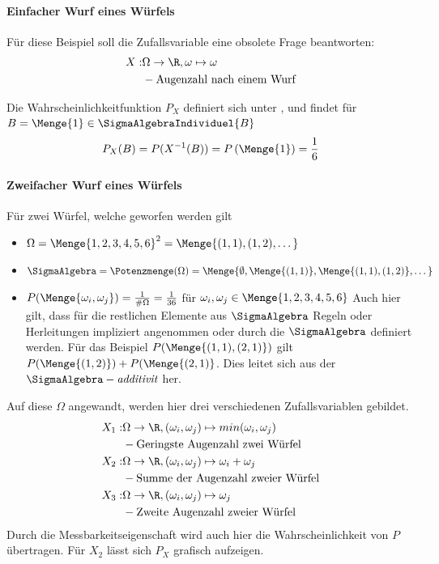 \paragraph{Einfacher Wurf eines Würfels}
Für diese Beispiel soll die Zufallsvariable eine obsolete Frage beantworten: 
\begin{align*}
	X:& \Omega \rightarrow \R, \omega \mapsto \omega \\
	& - \text{Augenzahl nach einem Wurf}
\end{align*}

Die Wahrscheinlichkeitfunktion $P_X$ definiert sich unter , und findet für $B= \Menge{1}\in \SigmaAlgebraIndividuel{B}$ 
\begin{align*}
	P_X(B) = P(X^{-1}(B))= P\left(\Menge{1}\right)=\frac{1}{6}
\end{align*}

\paragraph{Zweifacher Wurf eines Würfels}

Für zwei Würfel, welche geworfen werden gilt
\begin{itemize}
	\item $\Omega = \Menge{1,2,3,4,5,6}^2= \Menge{(1,1),(1,2), \dots}$
	\item $\SigmaAlgebra = \Potenzmenge (\Omega) = \Menge{\emptyset,\Menge{(1,1)}, \Menge{(1,1),(1,2)}, \dots}$
	\item $P(\Menge{\omega_i, \omega_j}) = \frac{1}{\#\Omega} = \frac{1}{36}$ für $\omega_i,\omega_j\in \Menge{1,2,3,4,5,6}$ Auch hier gilt, dass für die restlichen Elemente aus $\SigmaAlgebra$ Regeln oder Herleitungen impliziert angenommen oder durch die $\SigmaAlgebra$ definiert werden. Für das Beispiel $P(\Menge{(1,1),(2,1)})$ gilt $P(\Menge{(1,2)}) + P(\Menge{(2,1)}$. Dies leitet sich aus der $\SigmaAlgebra-\textit{additivit}$ her.
\end{itemize}

Auf diese $\Omega$ angewandt, werden hier drei verschiedenen Zufallsvariablen gebildet.
\begin{align*}
	X_1:& \Omega \rightarrow \R, (\omega_i,\omega_j) \mapsto min(\omega_i,\omega_j) \\
	& - \text{Geringste Augenzahl zwei Würfel}\\
	X_2:& \Omega \rightarrow \R, (\omega_i,\omega_j) \mapsto \omega_i+\omega_j \\
	& - \text{Summe der Augenzahl zweier Würfel}\\
	X_3:& \Omega \rightarrow \R, (\omega_i,\omega_j) \mapsto \omega_j\\
	& - \text{Zweite Augenzahl zweier Würfel}
\end{align*}
Durch die Messbarkeitseigenschaft  wird auch hier die Wahrscheinlichkeit von $P$ übertragen. Für $X_2$ lässt sich $P_X$ grafisch aufzeigen.

